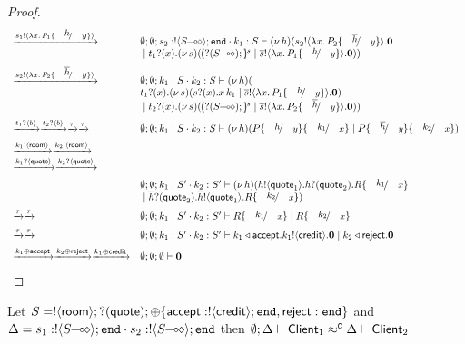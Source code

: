 \begin{proof}
\[\begin{array}{ll}
		\by{\bactout{s_1}{\abs{x}{P_1 \subst{h}{y}}}}&
		\es; \es; s_2: \btout{\lhot{S}} \tinact \cat k_1: S \proves \newsp{h}{\bout{s_2}{\abs{x}{P_2 \subst{\dual{h}}{y}}} \inact\\
		& \Par \binp{t_1}{x} \newsp{s}{\mapchar{\btinp{\lhot{S}}}{s} \Par \bout{\dual{s}}{\abs{x}{P_1 \subst{h}{y}}} \inact }}
\\[2mm]

		\by{\bactout{s_2}{\abs{x}{P_2 \subst{\dual{h}}{y}}}}&
		\es; \es; k_1: S \cat k_2: S \proves \newsp{h}{\\
		& \binp{t_1}{x} \newsp{s}{\binp{s}{x} \appl{x}{k_1} \Par \bout{\dual{s}}{\abs{x}{P_1 \subst{h}{y}}} \inact }\\
		& \Par \binp{t_2}{x} \newsp{s}{\mapchar{\btinp{\lhot{S}}}{s} \Par \bout{\dual{s}}{\abs{x}{P_2 \subst{\dual{h}}{y}}} \inact }}
\\[2mm]

		\by{\bactinp{t_1}{b}} \by{\bactinp{t_2}{b}} \by{\tau}\by{\tau}&
		\es; \es; k_1: S \cat k_2: S \proves \newsp{h}{
		P\subst{h}{y} \subst{k_1}{x} \Par P\subst{\dual{h}}{y} \subst{k_2}{x}}
\\[2mm]

		\by{\bactout{k_1}{\rtype}} \by{\bactout{k_2}{\rtype}}&
\\
		\by{\bactinp{k_1}{\Quote}} \by{\bactinp{k_2}{\Quote}}&
\\[2mm]

		& \es; \es; k_1: S' \cat k_2: S' \proves \newsp{h}{
		\bout{h}{\Quote_1} \binp{h}{\Quote_2} R \subst{k_1}{x} \\
		& \Par \binp{\dual{h}}{\Quote_2} \bout{\dual{h}}{\Quote_1} R \subst{k_2}{x}}
\\[2mm]
		\by{\tau} \by{\tau}&
		\es; \es; k_1: S' \cat k_2: S' \proves R \subst{k_1}{x} \Par R \subst{k_2}{x}
\\[2mm]
		\by{\tau} \by{\tau}&
		\es; \es; k_1: S' \cat k_2: S' \proves
		\bsel{k_1}{\accept} \bout{k_1}{\creditc} \inact 
		\Par \bsel{k_2}{\reject} \inact
\\[2mm]
		\by{\bactsel{k_1}{\accept}} \by{\bactsel{k_2}{\reject}} \by{\bactsel{k_1}{\creditc}}&
		\es; \es; \es \proves \inact
	\end{array}
\]
\end{proof}


\begin{proposition}
	Let
	$S = ! \langle \mathsf{room} \rangle ; ? (\mathsf{quote}) ; \oplus \{\mathsf{accept}: ! \langle \mathsf{credit} \rangle ; \mathtt{end}, \mathsf{reject}: \mathtt{end}\}$
	and $\Delta = s_1: \btout{\lhot{S}} \tinact \cat s_2: \btout{\lhot{S}} \tinact$
	then
	$ \emptyset; \Delta \vdash \mathsf{Client}_1 \approx^\mathtt{C} \Delta \vdash \mathsf{Client}_2$
\end{proposition}

